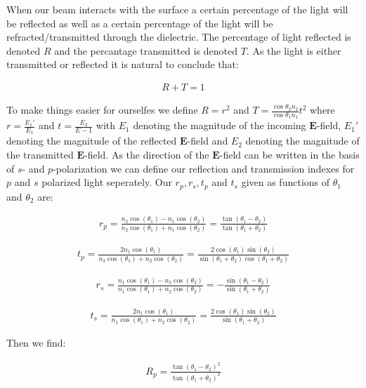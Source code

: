 When our beam interacts with the surface a certain percentage of the light will be reflected as well as a certain percentage of the light will be refracted/transmitted through the dielectric. The percentage of light reflected is denoted $R$ and the percantage transmitted is denoted $T$. As the light is either transmitted or reflected it is natural to conclude that:

\begin{align}
R+T=1
\end{align}

To make things easier for ourselfes we define $R=r^2$ and $T=\frac{\cos{\theta_2}n_2}{\cos{\theta_1}n_1}t^2$ where $r=\frac{E_1'}{E_1}$ and  $t=\frac{E_2}{E-1}$ with $E_1$ denoting the magnitude of the incoming $\textbf{E}$-field, $E_1'$ denoting the magnitude of the reflected $\textbf{E}$-field and $E_2$ denoting the magnitude of the transmitted $\textbf{E}$-field. As the direction of the $\textbf{E}$-field can be written in the basis of $s$- and $p$-polarization we can define our reflection and transmission indexes for $p$ and $s$ polarized light seperately. Our $r_p,r_s,t_p$ and $t_s$ given as functions of $\theta_1$ and $\theta_2$ are:

\begin{align}
r_p=\frac{n_{2}\cos(\theta_1)-n_1\cos(\theta_2)}{n_2\cos(\theta_1)+n_1\cos(\theta_2)} = \frac{\tan(\theta_1-\theta_2)}{\tan(\theta_1+\theta_2)}
\end{align}

\begin{align}
t_p = \frac{2n_1\cos(\theta_1)}{n_2\cos(\theta_1)+n_2\cos(\theta_2)} 
= \frac{2\cos(\theta_1)\sin(\theta_2)}{\sin(\theta_1+\theta_2)\cos(\theta_1+\theta_2)}
\end{align}

\begin{align}
r_{s} = \frac{n_1\cos(\theta_1)-n_2\cos(\theta_2)}{n_1\cos(\theta_1)+n_2\cos(\theta_2)}= -\frac{\sin(\theta_1-\theta_2)}{\sin(\theta_1+\theta_2)}
\end{align}

\begin{align}
t_s = \frac{2n_1\cos(\theta_1)}{n_1\cos(\theta_1)+n_2\cos(\theta_2)} = \frac{2\cos(\theta_1)\sin(\theta_2)}{\sin(\theta_1+\theta_2)}
\end{align}

Then we find:

\begin{align}
R_p = \frac{\tan(\theta_1-\theta_2)^2}{\tan(\theta_1+\theta_2)^2}
\end{align}

